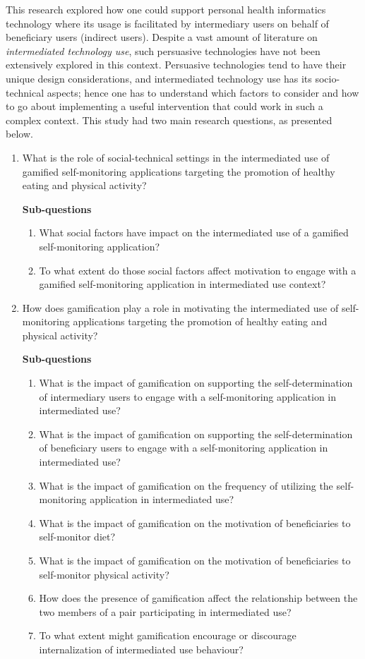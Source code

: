 This research explored how one could support personal health informatics technology where its usage is facilitated by intermediary users on behalf of beneficiary users (indirect users). Despite a vast amount of literature on \emph{intermediated technology use}, such persuasive technologies have not been extensively explored in this context. Persuasive technologies tend to have their unique design considerations, and intermediated technology use has its socio-technical aspects; hence one has to understand which factors to consider and how to go about implementing a useful intervention that could work in such a complex context. This study had two main research questions, as presented below.
\begin{enumerate}
\item What is the role of social-technical settings in the intermediated use of gamified self-monitoring applications targeting the promotion of healthy eating and physical activity?

\textbf{Sub-questions}
\begin{enumerate}[label=\alph*.]
\item What social factors have impact on the intermediated use of a gamified self-monitoring application?
\item To what extent do those social factors affect motivation to engage with a gamified self-monitoring application in intermediated use context?
\end{enumerate}
\item How does gamification play a role in motivating the intermediated use of self-monitoring applications targeting the promotion of healthy eating and physical activity?

\textbf{Sub-questions}
\begin{enumerate}[label=\alph*.]
\item What is the impact of gamification on supporting the self-determination of intermediary users to engage with a self-monitoring application in intermediated use?
\item What is the impact of gamification on supporting the self-determination of beneficiary users to engage with a self-monitoring application in intermediated use?
\item What is the impact of gamification on the frequency of utilizing the self-monitoring application in intermediated use?
\item What is the impact of gamification on the motivation of beneficiaries to self-monitor diet?
\item What is the impact of gamification on the motivation of beneficiaries to self-monitor physical activity?
\item How does the presence of gamification affect the relationship between the two members of a pair participating in intermediated use?
\item To what extent might gamification encourage or discourage internalization of intermediated use behaviour?
\end{enumerate}
\end{enumerate}  
